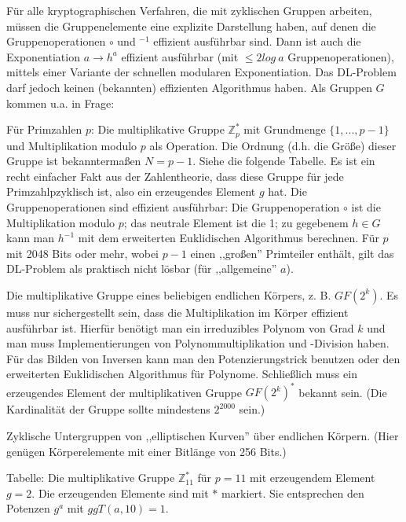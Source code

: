 \documentclass[a4paper]{article}
\begin{document}
\begin{multicols}{3}
        Für alle kryptographischen Verfahren, die mit zyklischen Gruppen arbeiten, müssen die Gruppenelemente eine explizite Darstellung haben, auf denen die Gruppenoperationen $\circ$ und $^{-1}$ effizient ausführbar sind.
        Dann ist auch die Exponentiation $a\rightarrow h^a$ effizient ausführbar (mit $\leq 2 log\ a$ Gruppenoperationen), mittels einer Variante der schnellen modularen Exponentiation. Das DL-Problem darf jedoch keinen (bekannten) effizienten Algorithmus haben.
        Als Gruppen $G$ kommen u.a. in Frage:
        \begin{itemize*}
            \item Für Primzahlen $p$: Die multiplikative Gruppe $\mathbb{Z}^*_p$ mit Grundmenge $\{1,...,p-1\}$ und Multiplikation modulo $p$ als Operation. Die Ordnung (d.h. die Größe) dieser Gruppe ist bekanntermaßen $N=p-1$. Siehe die folgende Tabelle. Es ist ein recht einfacher Fakt aus der Zahlentheorie, dass diese Gruppe für jede Primzahlpzyklisch ist, also ein erzeugendes Element $g$ hat. Die Gruppenoperationen sind effizient ausführbar: Die Gruppenoperation $\circ$ ist die Multiplikation modulo $p$; das neutrale Element ist die 1; zu gegebenem $h\in G$ kann man $h^{-1}$ mit dem erweiterten Euklidischen Algorithmus berechnen. Für $p$ mit 2048 Bits oder mehr, wobei $p-1$ einen ,,großen'' Primteiler enthält, gilt das DL-Problem als praktisch nicht lösbar (für ,,allgemeine'' $a$).
            \item Die multiplikative Gruppe eines beliebigen endlichen Körpers, z. B. $GF(2^k)$. Es muss nur sichergestellt sein, dass die Multiplikation im Körper effizient ausführbar ist. Hierfür benötigt man ein irreduzibles Polynom von Grad $k$ und man muss Implementierungen von Polynommultiplikation und -Division haben. Für das Bilden von Inversen kann man den Potenzierungstrick benutzen oder den erweiterten Euklidischen Algorithmus für Polynome. Schließlich muss ein erzeugendes Element der multiplikativen Gruppe $GF(2^k)^*$ bekannt sein. (Die Kardinalität der Gruppe sollte mindestens $2^{2000}$ sein.)
            \item Zyklische Untergruppen von ,,elliptischen Kurven'' über endlichen Körpern. (Hier genügen Körperelemente mit einer Bitlänge von 256 Bits.)
        \end{itemize*}

        Tabelle: Die multiplikative Gruppe $\mathbb{Z}^*_{11}$ für $p=11$ mit erzeugendem Element $g=2$. Die erzeugenden Elemente sind mit $*$ markiert. Sie entsprechen den Potenzen $g^a$ mit $ggT(a,10) = 1$.


\end{multicols}
\end{document}
